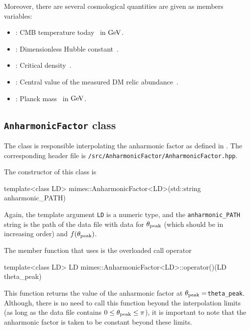 \documentclass[11pt,a4paper]{article}
\begin{document}
Moreover, there are several cosmological quantities are given as members variables:
%
\begin{itemize}
	\item {}: CMB temperature today~\cite{Zyla:2020zbs} in ${\rm GeV}$.
	\item {}: Dimensionless Hubble constant~\cite{Zyla:2020zbs}.
	\item {}: Critical density~\cite{Zyla:2020zbs}.
	\item {}: Central value of the measured DM relic abundance~\cite{Planck:2018vyg}.
	\item {}: Planck mass~\cite{Zyla:2020zbs} in ${\rm GeV}$.
\end{itemize}


\subsection{{\tt AnharmonicFactor} class}
%
The class  is responsible interpolating the anharmonic factor as defined in . The corresponding header file is {\tt \mimes/src/AnharmonicFactor/AnharmonicFactor.hpp}. 

The constructor of this class is
%
\begin{cpp}
	template<class LD>
	mimes::AnharmonicFactor<LD>(std::string anharmonic_PATH)
\end{cpp}
%
Again, the template argument {\tt LD} is a numeric type, and the {\tt anharmonic\_PATH} string is the path of the data file with data for $\theta_{\rm peak}{}$ (which should be in increasing order) and $f(\theta_{\rm peak}{})$.

The member function that \mimes uses is the overloaded call operator
%
\begin{cpp}
	template<class LD> LD mimes::AnharmonicFactor<LD>::operator()(LD theta_peak)
\end{cpp}
%
This function returns the value of the anharmonic factor at $\theta_{\rm peak}{}=${\tt theta\_peak}. Although, there is no need to call this function beyond the interpolation limits (as long as the data file contains $0\leq \theta_{\rm peak}{} \leq \pi$), it is important to note that the anharmonic factor is taken to be constant beyond these limits. 
\end{document}

